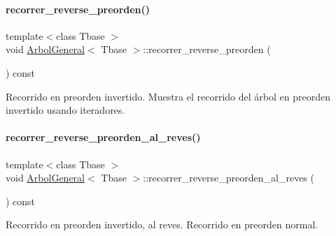 \hypertarget{classArbolGeneral_a49e61a49ae143e325f408af7b3930751}{}\label{classArbolGeneral_a49e61a49ae143e325f408af7b3930751} 
\paragraph{\texorpdfstring{recorrer\+\_\+reverse\+\_\+preorden()}{recorrer\_reverse\_preorden()}}
{\footnotesize\ttfamily template$<$class Tbase $>$ \\
void \hyperlink{classArbolGeneral}{Arbol\+General}$<$ Tbase $>$\+::recorrer\+\_\+reverse\+\_\+preorden (\begin{DoxyParamCaption}{ }\end{DoxyParamCaption}) const}



Recorrido en preorden invertido.  Muestra el recorrido del árbol en preorden invertido usando iteradores. 

\hypertarget{classArbolGeneral_a0a427c239f20f7ef0088848570f4095e}{}\label{classArbolGeneral_a0a427c239f20f7ef0088848570f4095e} 
\paragraph{\texorpdfstring{recorrer\+\_\+reverse\+\_\+preorden\+\_\+al\+\_\+reves()}{recorrer\_reverse\_preorden\_al\_reves()}}
{\footnotesize\ttfamily template$<$class Tbase $>$ \\
void \hyperlink{classArbolGeneral}{Arbol\+General}$<$ Tbase $>$\+::recorrer\+\_\+reverse\+\_\+preorden\+\_\+al\+\_\+reves (\begin{DoxyParamCaption}{ }\end{DoxyParamCaption}) const}



Recorrido en preorden invertido, al reves.  Recorrido en preorden normal. 

\hypertarget{classArbolGeneral_a5fd1c0acc26d4229042ecd9af6e3a24e}{}\label{classArbolGeneral_a5fd1c0acc26d4229042ecd9af6e3a24e} 
